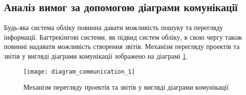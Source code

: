 \documentclass[../main.tex]{subfiles}
\begin{document}
\subsection{Аналіз вимог за допомогою діаграми комунікації}

Будь-яка система обліку повинна давати можливість пошуку та перегляду інформації. Багтрекінгові системи, як підвид систем обліку, в свою чергу також повинні надавати можливість створення звітів. Механізм перегляду проектів та звітів у вигляді діаграми комунікації зображено на діаграмі \ref{figure_diag_comm_1}.

\begin{figure}[H]
	\centering
	\texttt{[image: diagram\_communication\_1]}
	\caption{Механізм перегляду проектів та звітів у вигляді діаграми комунікації}
	\label{figure_diag_comm_1}
\end{figure}

\end{document}
